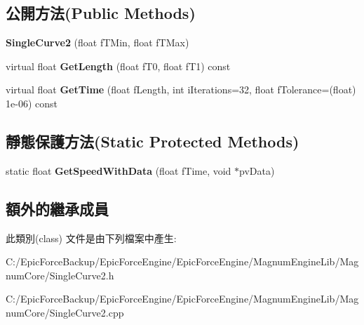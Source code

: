 \subsection*{公開方法(Public Methods)}
\begin{DoxyCompactItemize}
\item 
{\bfseries Single\+Curve2} (float f\+T\+Min, float f\+T\+Max)\hypertarget{class_magnum_1_1_single_curve2_a1c2d2cc4de905f936eb9a47fa27634b2}{}\label{class_magnum_1_1_single_curve2_a1c2d2cc4de905f936eb9a47fa27634b2}

\item 
virtual float {\bfseries Get\+Length} (float f\+T0, float f\+T1) const \hypertarget{class_magnum_1_1_single_curve2_a343e3f8d1e52178ef9cb4391350d6a77}{}\label{class_magnum_1_1_single_curve2_a343e3f8d1e52178ef9cb4391350d6a77}

\item 
virtual float {\bfseries Get\+Time} (float f\+Length, int i\+Iterations=32, float f\+Tolerance=(float) 1e-\/06) const \hypertarget{class_magnum_1_1_single_curve2_ac5d438b7925ba8ff79ff6cecb801964e}{}\label{class_magnum_1_1_single_curve2_ac5d438b7925ba8ff79ff6cecb801964e}

\end{DoxyCompactItemize}
\subsection*{靜態保護方法(Static Protected Methods)}
\begin{DoxyCompactItemize}
\item 
static float {\bfseries Get\+Speed\+With\+Data} (float f\+Time, void $\ast$pv\+Data)\hypertarget{class_magnum_1_1_single_curve2_a4ebd7e7caad22232ee3b4b5c15716003}{}\label{class_magnum_1_1_single_curve2_a4ebd7e7caad22232ee3b4b5c15716003}

\end{DoxyCompactItemize}
\subsection*{額外的繼承成員}


此類別(class) 文件是由下列檔案中產生\+:\begin{DoxyCompactItemize}
\item 
C\+:/\+Epic\+Force\+Backup/\+Epic\+Force\+Engine/\+Epic\+Force\+Engine/\+Magnum\+Engine\+Lib/\+Magnum\+Core/Single\+Curve2.\+h\item 
C\+:/\+Epic\+Force\+Backup/\+Epic\+Force\+Engine/\+Epic\+Force\+Engine/\+Magnum\+Engine\+Lib/\+Magnum\+Core/Single\+Curve2.\+cpp\end{DoxyCompactItemize}
